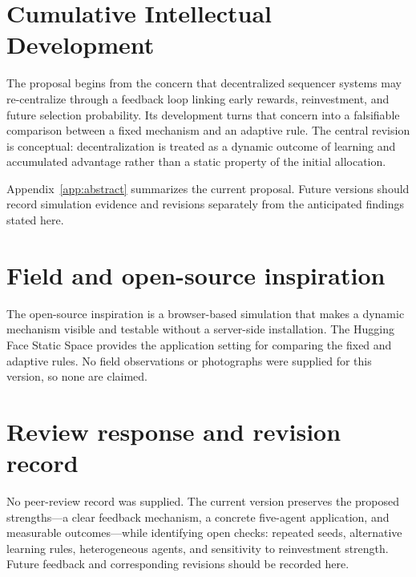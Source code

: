 \section{Cumulative Intellectual Development}
The proposal begins from the concern that decentralized sequencer systems may re-centralize through a feedback loop linking early rewards, reinvestment, and future selection probability. Its development turns that concern into a falsifiable comparison between a fixed mechanism and an adaptive rule. The central revision is conceptual: decentralization is treated as a dynamic outcome of learning and accumulated advantage rather than a static property of the initial allocation.

Appendix~\ref{app:abstract} summarizes the current proposal. Future versions should record simulation evidence and revisions separately from the anticipated findings stated here.

\section{Field and open-source inspiration}
The open-source inspiration is a browser-based simulation that makes a dynamic mechanism visible and testable without a server-side installation. The Hugging Face Static Space provides the application setting for comparing the fixed and adaptive rules. No field observations or photographs were supplied for this version, so none are claimed.

\section{Review response and revision record}
No peer-review record was supplied. The current version preserves the proposed strengths---a clear feedback mechanism, a concrete five-agent application, and measurable outcomes---while identifying open checks: repeated seeds, alternative learning rules, heterogeneous agents, and sensitivity to reinvestment strength. Future feedback and corresponding revisions should be recorded here.

\clearpage\onecolumn
